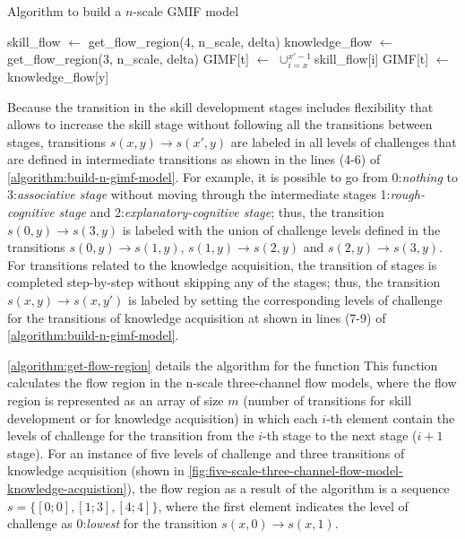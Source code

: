 \begin{algoritmo}
\caption{Algorithm to build a $n$-scale GMIF model}
\label{algorithm:build-n-gimf-model}
\begin{algorithmic}[1]\small
{}
  \State skill\_flow $\gets$ get\_flow\_region(4, n\_scale, delta)
  \State knowledge\_flow $\gets$ get\_flow\_region(3, n\_scale, delta)
    \State GIMF[t] $\gets$ $\cup_{i=x}^{x'-1}$skill\_flow[i]
  \EndFor
    \State GIMF[t] $\gets$  knowledge\_flow[y]
  \EndFor
\EndProcedure
\end{algorithmic}
\end{algoritmo}

Because the transition in the skill development stages includes flexibility that allows to increase the skill stage without following all the transitions between stages, transitions $s(x,y) \to s(x',y)$ are labeled in all levels of challenges that are defined in intermediate transitions as shown in the lines (4-6) of \autoref{algorithm:build-n-gimf-model}.
For example, it is possible to go from 0:\emph{nothing} to 3:\emph{associative stage} without moving through the intermediate stages 1:\emph{rough-cognitive stage} and 2:\emph{explanatory-cognitive stage}; thus, the transition $s(0,y) \to s(3,y)$ is labeled with the union of challenge levels defined in the transitions $s(0,y) \to s(1,y)$, $s(1,y) \to s(2,y)$ and $s(2,y) \to s(3,y)$.
For transitions related to the knowledge acquisition, the transition of stages is completed step-by-step without skipping any of the stages; thus, the transition $s(x,y) \to s(x,y')$ is labeled by setting the corresponding levels of challenge for the transitions of knowledge acquisition at shown in lines (7-9) of \autoref{algorithm:build-n-gimf-model}.

\autoref{algorithm:get-flow-region} details the algorithm for the function 
This function calculates the flow region in the n-scale three-channel flow models, where the flow region is represented as an array of size $m$ (number of transitions for skill development or for knowledge acquisition) in which each $i$-th element contain the levels of challenge for the transition from the $i$-th stage to the next stage ($i+1$ stage).
For an instance of five levels of challenge and three transitions of knowledge acquisition (shown in \autoref{fig:five-scale-three-channel-flow-model-knowledge-acquistion}), the flow region as a result of the algorithm is a sequence $s = \{[0;0], [1;3], [4;4]\}$, where the first element \aspas{$[0;0]$} indicates the level of challenge as 0:\emph{lowest} for the transition $s(x,0) \to s(x,1)$.

